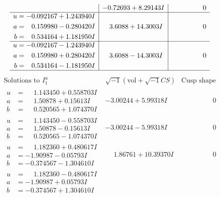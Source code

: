 \documentclass[1p]{elsarticle_modified}
\theoremstyle{definition}
\newcommand{\I}{\sqrt{-1}}
\begin{document}
$$\begin{array}{c|c|c}
 & -0.72693 + 8.29143 I & \phantom{-0.000000 } 0 \\ \hline\begin{aligned}
u &= -0.092167 + 1.243940 I \\
a &= \phantom{-}0.159980 - 0.280420 I \\
b &= \phantom{-}0.534164 + 1.181950 I\end{aligned}
 & \phantom{-}3.6088 + 14.3003 I & \phantom{-0.000000 } 0 \\ \hline\begin{aligned}
u &= -0.092167 - 1.243940 I \\
a &= \phantom{-}0.159980 + 0.280420 I \\
b &= \phantom{-}0.534164 - 1.181950 I\end{aligned}
 & \phantom{-}3.6088 - 14.3003 I & \phantom{-0.000000 } 0\\
 \hline 
 \end{array}$$\newpage$$\begin{array}{c|c|c}  
\text{Solutions to }I^u_{1}& \I (\text{vol} + \sqrt{-1}CS) & \text{Cusp shape}\\
 \hline 
\begin{aligned}
u &= \phantom{-}1.143450 + 0.558703 I \\
a &= \phantom{-}1.50878 + 0.15613 I \\
b &= \phantom{-}0.520565 + 1.074370 I\end{aligned}
 & -3.00244 + 5.99318 I & \phantom{-0.000000 } 0 \\ \hline\begin{aligned}
u &= \phantom{-}1.143450 - 0.558703 I \\
a &= \phantom{-}1.50878 - 0.15613 I \\
b &= \phantom{-}0.520565 - 1.074370 I\end{aligned}
 & -3.00244 - 5.99318 I & \phantom{-0.000000 } 0 \\ \hline\begin{aligned}
u &= \phantom{-}1.182360 + 0.480617 I \\
a &= -1.90987 - 0.05793 I \\
b &= -0.374567 - 1.304610 I\end{aligned}
 & \phantom{-}1.86761 + 10.39370 I & \phantom{-0.000000 } 0 \\ \hline\begin{aligned}
u &= \phantom{-}1.182360 - 0.480617 I \\
a &= -1.90987 + 0.05793 I \\
b &= -0.374567 + 1.304610 I\end{aligned}

\end{array}$$
\end{document}
